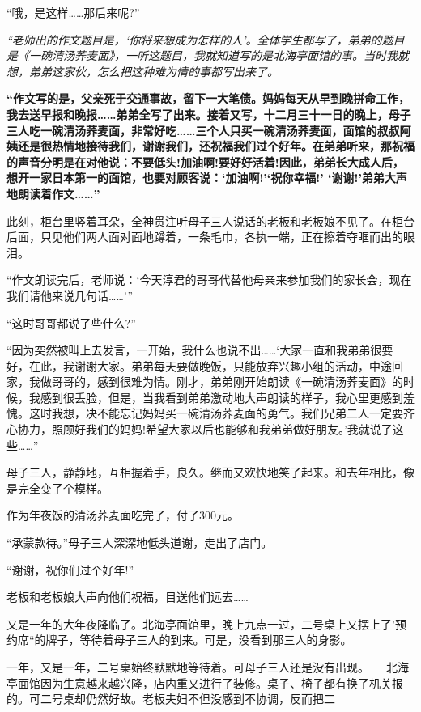 \documentclass[UTF8,a4paper,8pt]{ctexbook}
\begin{document}
			  “哦，是这样……那后来呢?”
			  
			 \textit{ “老师出的作文题目是，‘你将来想成为怎样的人’。全体学生都写了，弟弟的题目是《一碗清汤荞麦面》，一听这题目，我就知道写的是北海亭面馆的事。当时我就想，弟弟这家伙，怎么把这种难为情的事都写出来了。}
			  
			  \textbf{“作文写的是，父亲死于交通事故，留下一大笔债。妈妈每天从早到晚拼命工作，我去送早报和晚报……弟弟全写了出来。接着又写，十二月三十一日的晚上，母子三人吃一碗清汤荞麦面，非常好吃……三个人只买一碗清汤荞麦面，面馆的叔叔阿姨还是很热情地接待我们，谢谢我们，还祝福我们过个好年。在弟弟听来，那祝福的声音分明是在对他说：不要低头!加油啊!要好好活着!因此，弟弟长大成人后，想开一家日本第一的面馆，也要对顾客说：‘加油啊!’‘祝你幸福!’ ‘谢谢!’弟弟大声地朗读着作文……”}
			  
			  此刻，柜台里竖着耳朵，全神贯注听母子三人说话的老板和老板娘不见了。在柜台后面，只见他们两人面对面地蹲着，一条毛巾，各执一端，正在擦着夺眶而出的眼泪。
			  
			  “作文朗读完后，老师说：‘今天淳君的哥哥代替他母亲来参加我们的家长会，现在我们请他来说几句话……’”
			  
			  “这时哥哥都说了些什么?”
			  
			  “因为突然被叫上去发言，一开始，我什么也说不出……‘大家一直和我弟弟很要好，在此，我谢谢大家。弟弟每天要做晚饭，只能放弃兴趣小组的活动，中途回家，我做哥哥的，感到很难为情。刚才，弟弟刚开始朗读《一碗清汤荞麦面》的时候，我感到很丢脸，但是，当我看到弟弟激动地大声朗读的样子，我心里更感到羞愧。这时我想，决不能忘记妈妈买一碗清汤荞麦面的勇气。我们兄弟二人一定要齐心协力，照顾好我们的妈妈!希望大家以后也能够和我弟弟做好朋友。’我就说了这些……”
			  
			  母子三人，静静地，互相握着手，良久。继而又欢快地笑了起来。和去年相比，像是完全变了个模样。
			  
			  作为年夜饭的清汤荞麦面吃完了，付了300元。
			  
			  “承蒙款待。”母子三人深深地低头道谢，走出了店门。
			  
			  “谢谢，祝你们过个好年!”
			  
			  老板和老板娘大声向他们祝福，目送他们远去……
			  
			  又是一年的大年夜降临了。北海亭面馆里，晚上九点一过，二号桌上又摆上了’预约席“的牌子，等待着母子三人的到来。可是，没看到那三人的身影。
			  
			  一年，又是一年，二号桌始终默默地等待着。可母子三人还是没有出现。　　北海亭面馆因为生意越来越兴隆，店内重又进行了装修。桌子、椅子都有换了机关报的。可二号桌却仍然好故。老板夫妇不但没感到不协调，反而把二
			  
\end{document}
